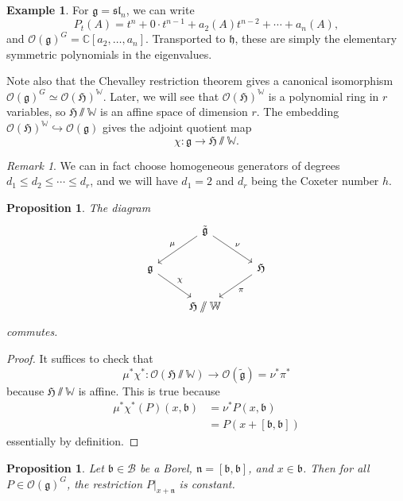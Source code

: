 \documentclass{amsart}
\newtheorem{prop}[thm]{Proposition}
\theoremstyle{definition}
\newtheorem{exm}[thm]{Example}
\theoremstyle{remark}
\newtheorem{rmk}[thm]{Remark}
\theoremstyle{plain}
\theoremstyle{definition}
\theoremstyle{remark}
\newcommand{\C}{\mathbb{C}}
\newcommand{\g}{\mathfrak{g}}
\newcommand{\h}{\mathfrak{h}}
\newcommand{\n}{\mathfrak{n}}
\renewcommand{\b}{\mathfrak{b}}
\newcommand{\mc}[1]{\mathcal{#1}}
\newcommand{\mf}[1]{\mathfrak{#1}}
\newcommand{\mbb}[1]{\mathbb{#1}}
\newcommand{\1}{\mathbf{1}}
\newcommand{\2}{\mathbf{2}}
\newcommand{\3}{\mathbf{3}}
\renewcommand{\sl}{\mf{sl}}
\begin{document}
\begin{exm}
    For \(\g = \sl_n\), we can write
    \[ P_t(A) = t^n + 0 \cdot t^{n-1} + a_2(A) t^{n-2} + \cdots + a_n(A), \]
    and \(\mc{O}(\g)^G = \C[a_2, \ldots, a_n]\). Transported to \(\h\), these are simply the elementary symmetric polynomials in the eigenvalues.
\end{exm}

Note also that the Chevalley restriction theorem gives a canonical isomorphism \(\mc{O}(\g)^G \simeq \mc{O}(\mf{H})^{\mbb{W}}\). Later, we will see that \(\mc{O}(\mf{H})^{\mbb{W}}\) is a polynomial ring in \(r\) variables, so \(\mf{H}\sslash \mbb{W}\) is an affine space of dimension \(r\). The embedding \(\mc{O}(\mf{H})^{\mbb{W}} \hookrightarrow \mc{O}(\g)\) gives the adjoint quotient map
\[ \chi \colon \g \to \mf{H} \sslash \mbb{W}. \]

\begin{rmk}
    We can in fact choose homogeneous generators of degrees \(d_1 \leq d_2 \leq \cdots \leq d_r\), and we will have \(d_1 = 2\) and \(d_r\) being the Coxeter number \(h\).
\end{rmk}

\begin{prop}
    The diagram
    \begin{equation*}
    \begin{tikzcd}
        & \tilde{\g} \ar{dl}[swap]{\mu} \ar{dr}{\nu} \\
        \g \ar{dr}{\chi} & & \mf{H} \ar{dl}{\pi} \\
        & \mf{H} \sslash \mbb{W}
    \end{tikzcd}
    \end{equation*}
    commutes.
\end{prop}

\begin{proof}
    It suffices to check that 
    \[ \mu^* \chi^* \colon \mc{O}(\mf{H} \sslash \mbb{W}) \to \mc{O}(\tilde{\g}) = \nu^* \pi^* \]
    because \(\mf{H} \sslash \mbb{W}\) is affine. This is true because
    \begin{align*}
        \mu^* \chi^* (P)(x, \b) &= \nu^* P(x, \b) \\
        &= P(x + [\b, \b])
    \end{align*}
    essentially by definition.
\end{proof}

\begin{prop}
    Let \(\b \in \mc{B}\) be a Borel, \(\n = [\b, \b]\), and \(x \in \b\). Then for all \(P \in \mc{O}(\g)^G\), the restriction \(P|_{x + \n}\) is constant.
\end{prop}
\end{document}

